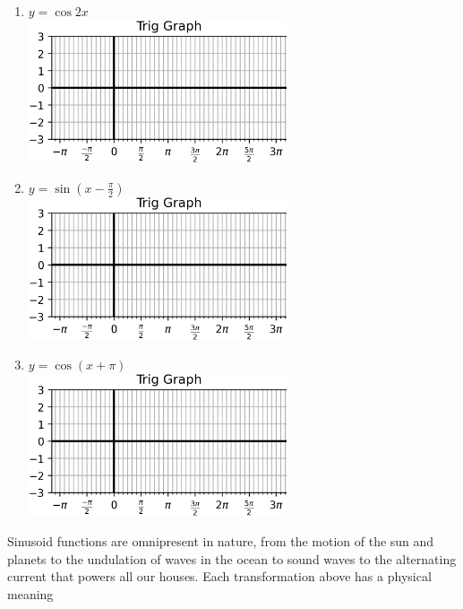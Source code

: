 \documentclass{article}
\begin{document}
\begin{multicols}{2}
\begin{enumerate}
	\item $y=\cos 2x$ \\
	\includegraphics*[width=3in]{Trig Graph.png}
	\item $y=\sin(x-\frac{\pi}{2})$ \\
	\includegraphics*[width=3in]{Trig Graph.png}
	\item $y=\cos(x+\pi)$ \\
	\includegraphics*[width=3in]{Trig Graph.png}
\end{enumerate}

Sinusoid functions are omnipresent in nature, from the motion of the
sun and planets to the undulation of waves in the ocean to sound waves
to the alternating current that powers all our houses. Each transformation above has a physical meaning


\end{multicols}
\end{document}
